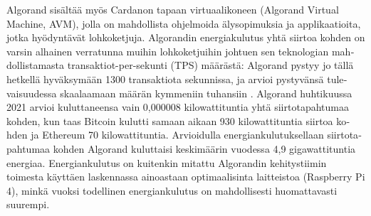 \begin{otherlanguage}{english}
Algorand sisältää myös Cardanon tapaan virtuaalikoneen (Algorand Virtual Machine, AVM), jolla on mahdollista ohjelmoida älysopimuksia ja applikaatioita, jotka hyödyntävät lohkoketjuja. Algorandin energiakulutus yhtä siirtoa kohden on varsin alhainen verratunna muihin lohkoketjuihin johtuen sen teknologian mahdollistamasta transaktiot-per-sekunti (TPS) määrästä: Algorand pystyy jo tällä hetkellä hyväksymään 1300 transaktiota sekunnissa, ja arvioi pystyvänsä tulevaisuudessa skaalaamaan määrän kymmeniin tuhansiin \cite{algorandenergy}. Algorand huhtikuussa 2021 arvioi kuluttaneensa vain 0,000008 kilowattituntia yhtä siirtotapahtumaa kohden, kun taas Bitcoin kulutti samaan aikaan 930 kilowattituntia siirtoa kohden ja Ethereum 70 kilowattituntia. Arvioidulla energiankulutuksellaan siirtotapahtumaa kohden Algorand kuluttaisi keskimäärin vuodessa 4,9 gigawattituntia energiaa. Energiankulutus on kuitenkin mitattu Algorandin kehitystiimin toimesta käyttäen laskennassa ainoastaan optimaalisinta laitteistoa (Raspberry Pi 4), minkä vuoksi todellinen energiankulutus on mahdollisesti huomattavasti suurempi.

\end{otherlanguage}